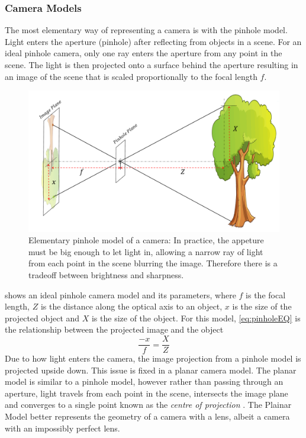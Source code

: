 \documentclass{UoNMCHA}
\numberwithin{equation}{section}
\begin{document}
\subsubsection{Camera Models}
The most elementary way of representing a camera is with the pinhole model. Light enters the aperture (pinhole) after reflecting from objects in a scene. For an ideal pinhole camera, only one ray enters the aperture from any point in the scene. The light is then projected onto a surface behind the aperture resulting in an image of the scene that is scaled proportionally to the focal length $f$.

\begin{figure}[ht]
    \begin{center}
        \includegraphics[width=.8\linewidth]{Figures/Pinhole_model}
        \caption{Elementary pinhole model of a camera: In practice, the appeture must be big enough to let light in, allowing a narrow ray of light from each point in the scene blurring the image. Therefore there is a tradeoff between brightness and sharpness.}
        \label{fig:PinholeModel}
    \end{center}
\end{figure}

 shows an ideal pinhole camera model and its parameters, where $f$ is the focal length, $Z$ is the distance along the optical axis to an object, $x$ is the size of the projected object and $X$ is the size of the object. For this model, \eqref{eq:pinholeEQ} is the relationship between the projected image and the object
\begin{equation}\label{eq:pinholeEQ}
	\frac{-x}{f} = \frac{X}{Z}
\end{equation}
Due to how light enters the camera, the image projection from a pinhole model is projected upside down. This issue is fixed in a planar camera model. The planar model is similar to a pinhole model, however rather than passing through an aperture, light travels from each point in the scene, intersects the image plane and converges to a single point known as the \textit{centre of projection} . The Plainar Model better represents the geometry of a camera with a lens, albeit a camera with an impossibly perfect lens.
\end{document}
